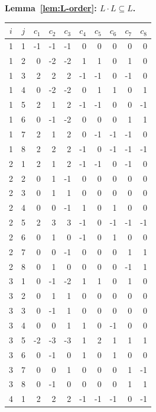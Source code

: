 \documentclass[twoside,english]{paper}
\numberwithin{equation}{section}
\numberwithin{figure}{section}
\theoremstyle{definition}
\theoremstyle{remark}
\begin{document}
\begin{table}[H]
\centering
{\bfseries Lemma~\ref{lem:L-order}: $L \cdot L \subseteq L$.}\par\medskip
\footnotesize
\setlength{\tabcolsep}{4pt}
\begin{minipage}[t]{0.48\textwidth}
\centering
\begin{tabular}{cc|rrrrrrrr}
\toprule
$i$ & $j$ & $c_1$ & $c_2$ & $c_3$ & $c_4$ & $c_5$ & $c_6$ & $c_7$ & $c_8$ \\
\midrule
1 & 1 & -1 & -1 & -1 & 0 & 0 & 0 & 0 & 0 \\
1 & 2 & 0 & -2 & -2 & 1 & 1 & 0 & 1 & 0 \\
1 & 3 & 2 & 2 & 2 & -1 & -1 & 0 & -1 & 0 \\
1 & 4 & 0 & -2 & -2 & 0 & 1 & 1 & 0 & 1 \\
1 & 5 & 2 & 1 & 2 & -1 & -1 & 0 & 0 & -1 \\
1 & 6 & 0 & -1 & -2 & 0 & 0 & 0 & 1 & 1 \\
1 & 7 & 2 & 1 & 2 & 0 & -1 & -1 & -1 & 0 \\
1 & 8 & 2 & 2 & 2 & -1 & 0 & -1 & -1 & -1 \\
\midrule
2 & 1 & 2 & 1 & 2 & -1 & -1 & 0 & -1 & 0 \\
2 & 2 & 0 & 1 & -1 & 0 & 0 & 0 & 0 & 0 \\
2 & 3 & 0 & 1 & 1 & 0 & 0 & 0 & 0 & 0 \\
2 & 4 & 0 & 0 & -1 & 1 & 0 & 1 & 0 & 0 \\
2 & 5 & 2 & 3 & 3 & -1 & 0 & -1 & -1 & -1 \\
2 & 6 & 0 & 1 & 0 & -1 & 0 & 1 & 0 & 0 \\
2 & 7 & 0 & 0 & -1 & 0 & 0 & 0 & 1 & 1 \\
2 & 8 & 0 & 1 & 0 & 0 & 0 & 0 & -1 & 1 \\
\midrule
3 & 1 & 0 & -1 & -2 & 1 & 1 & 0 & 1 & 0 \\
3 & 2 & 0 & 1 & 1 & 0 & 0 & 0 & 0 & 0 \\
3 & 3 & 0 & -1 & 1 & 0 & 0 & 0 & 0 & 0 \\
3 & 4 & 0 & 0 & 1 & 1 & 0 & -1 & 0 & 0 \\
3 & 5 & -2 & -3 & -3 & 1 & 2 & 1 & 1 & 1 \\
3 & 6 & 0 & -1 & 0 & 1 & 0 & 1 & 0 & 0 \\
3 & 7 & 0 & 0 & 1 & 0 & 0 & 0 & 1 & -1 \\
3 & 8 & 0 & -1 & 0 & 0 & 0 & 0 & 1 & 1 \\
\midrule
4 & 1 & 2 & 2 & 2 & -1 & -1 & -1 & 0 & -1 \\

\end{tabular}
\end{minipage}
\end{table}
\end{document}

